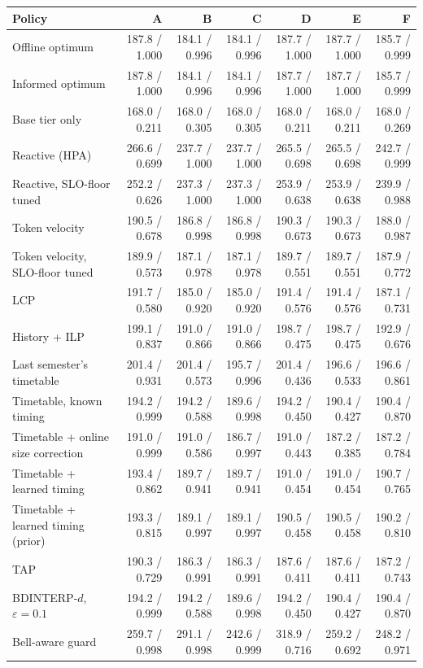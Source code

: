 \begin{tabular}{@{}lrrrrrr@{}}
\toprule
Policy & A & B & C & D & E & F \\
\midrule
Offline optimum & 187.8 / 1.000 & 184.1 / 0.996 & 184.1 / 0.996 & 187.7 / 1.000 & 187.7 / 1.000 & 185.7 / 0.999 \\
Informed optimum & 187.8 / 1.000 & 184.1 / 0.996 & 184.1 / 0.996 & 187.7 / 1.000 & 187.7 / 1.000 & 185.7 / 0.999 \\
Base tier only & 168.0 / 0.211 & 168.0 / 0.305 & 168.0 / 0.305 & 168.0 / 0.211 & 168.0 / 0.211 & 168.0 / 0.269 \\
Reactive (HPA) & 266.6 / 0.699 & 237.7 / 1.000 & 237.7 / 1.000 & 265.5 / 0.698 & 265.5 / 0.698 & 242.7 / 0.999 \\
Reactive, SLO-floor tuned & 252.2 / 0.626 & 237.3 / 1.000 & 237.3 / 1.000 & 253.9 / 0.638 & 253.9 / 0.638 & 239.9 / 0.988 \\
Token velocity & 190.5 / 0.678 & 186.8 / 0.998 & 186.8 / 0.998 & 190.3 / 0.673 & 190.3 / 0.673 & 188.0 / 0.987 \\
Token velocity, SLO-floor tuned & 189.9 / 0.573 & 187.1 / 0.978 & 187.1 / 0.978 & 189.7 / 0.551 & 189.7 / 0.551 & 187.9 / 0.772 \\
LCP & 191.7 / 0.580 & 185.0 / 0.920 & 185.0 / 0.920 & 191.4 / 0.576 & 191.4 / 0.576 & 187.1 / 0.731 \\
History + ILP & 199.1 / 0.837 & 191.0 / 0.866 & 191.0 / 0.866 & 198.7 / 0.475 & 198.7 / 0.475 & 192.9 / 0.676 \\
Last semester's timetable & 201.4 / 0.931 & 201.4 / 0.573 & 195.7 / 0.996 & 201.4 / 0.436 & 196.6 / 0.533 & 196.6 / 0.861 \\
Timetable, known timing & 194.2 / 0.999 & 194.2 / 0.588 & 189.6 / 0.998 & 194.2 / 0.450 & 190.4 / 0.427 & 190.4 / 0.870 \\
Timetable + online size correction & 191.0 / 0.999 & 191.0 / 0.586 & 186.7 / 0.997 & 191.0 / 0.443 & 187.2 / 0.385 & 187.2 / 0.784 \\
Timetable + learned timing & 193.4 / 0.862 & 189.7 / 0.941 & 189.7 / 0.941 & 191.0 / 0.454 & 191.0 / 0.454 & 190.7 / 0.765 \\
Timetable + learned timing (prior) & 193.3 / 0.815 & 189.1 / 0.997 & 189.1 / 0.997 & 190.5 / 0.458 & 190.5 / 0.458 & 190.2 / 0.810 \\
TAP & 190.3 / 0.729 & 186.3 / 0.991 & 186.3 / 0.991 & 187.6 / 0.411 & 187.6 / 0.411 & 187.2 / 0.743 \\
BDINTERP-$d$, $\varepsilon=0.1$ & 194.2 / 0.999 & 194.2 / 0.588 & 189.6 / 0.998 & 194.2 / 0.450 & 190.4 / 0.427 & 190.4 / 0.870 \\
Bell-aware guard & 259.7 / 0.998 & 291.1 / 0.998 & 242.6 / 0.999 & 318.9 / 0.716 & 259.2 / 0.692 & 248.2 / 0.971 \\
\bottomrule
\end{tabular}
